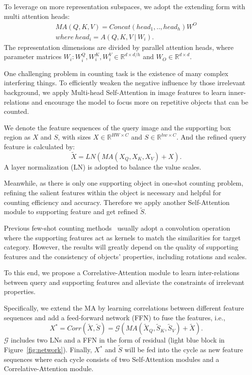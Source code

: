 \documentclass{article}
\begin{document}
To leverage on more representation subspaces, we adopt the extending form with multi attention heads:
\begin{equation}
\begin{aligned}
    MA(Q, K, V) = Concat(head_1,.., head_h)W^O \\
    where\ head_i = A(Q, K, V\ |\ W_i).
\end{aligned}
\end{equation}
The representation dimensions are divided by parallel attention heads, where parameter matrices $W_i:W_i^Q, W_i^K, W_i^V \in \mathbb{R}^{d \times d/h}$ and $W_O \in \mathbb{R}^{d \times d}$.

One challenging problem in counting task is the existence of many complex interfering things. To efficiently weaken the negative influence by those irrelevant background, we apply Multi-head Self-Attention in image features to learn inner-relations and encourage the model to focus more on repetitive objects that can be counted.

We denote the feature sequences of the query image and the supporting box region as $X$ and $S$, with sizes $X \in \mathbb{R}^{HW \times C}$ and $S \in \mathbb{R}^{hw \times C}$. And the refined query feature is calculated by:
\begin{equation}
    \tilde{X} = LN(MA(X_Q,X_K,X_V)+X).
\end{equation}
A layer normalization (LN) is adopted to balance the value scales.

Meanwhile, as there is only one supporting object in one-shot counting problem, refining the salient features within the object is necessary and helpful for counting efficiency and accuracy. Therefore we apply another Self-Attention module to supporting feature and get refined $\tilde{S}$.

Previous few-shot counting methods~\cite{ranjan2021learning, yang2021class} usually adopt a convolution operation where the supporting features act as kernels to match the similarities for target category. However, the results will greatly depend on the quality of supporting features and the consistency of objects' properties, including rotations and scales.

To this end, we propose a Correlative-Attention module to learn inter-relations between query and supporting features and alleviate the constraints of irrelevant properties.

Specifically, we extend the MA by learning correlations between different feature sequences and add a feed-forward network (FFN) to fuse the features, i.e.,
\begin{equation}
    X^* = Corr(\tilde{X}, \tilde{S}) = \mathcal{G} (MA(\tilde{X}_Q,\tilde{S}_K,\tilde{S}_V)+\tilde{X}).
\end{equation}
$\mathcal{G}$ includes two LNs and a FFN in the form of residual (light blue block in Figure~\ref{fig:network}). Finally, $X^*$ and $\tilde{S}$ will be fed into the cycle as new feature sequences where each cycle consists of two Self-Attention modules and a Correlative-Attention module.
\end{document}
